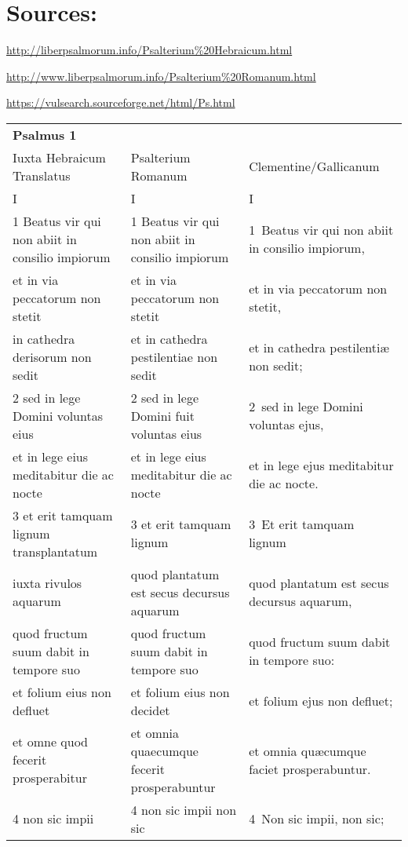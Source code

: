 \documentclass{article}
\begin{document}
					
					
\section*{Sources:}					

\url{http://liberpsalmorum.info/Psalterium%20Hebraicum.html}					

\url{http://www.liberpsalmorum.info/Psalterium%20Romanum.html}					

\url{https://vulsearch.sourceforge.net/html/Ps.html}					
					
\begin{longtable}{@{}p{}p{}p{}@{}}					
\textbf{Psalmus 1}					\\
Iuxta Hebraicum Translatus	&	Psalterium Romanum	&	Clementine/Gallicanum	\\
I	&	I	&	I	\\
1 Beatus vir qui non abiit in consilio impiorum	&	1 Beatus vir qui non abiit in consilio impiorum	&	1 Beatus vir qui non abiit in consilio impiorum,	\\
et in via peccatorum non stetit	&	et in via peccatorum non stetit	&	et in via peccatorum non stetit,	\\
in cathedra derisorum non sedit	&	et in cathedra pestilentiae non sedit	&	et in cathedra pestilentiæ non sedit;	\\
2 sed in lege Domini voluntas eius	&	2 sed in lege Domini fuit voluntas eius	&	2 sed in lege Domini voluntas ejus,	\\
et in lege eius meditabitur die ac nocte	&	et in lege eius meditabitur die ac nocte	&	et in lege ejus meditabitur die ac nocte.	\\
3 et erit tamquam lignum transplantatum 	&	3 et erit tamquam lignum	&	3 Et erit tamquam lignum 	\\
iuxta rivulos aquarum	&	quod plantatum est secus decursus aquarum	&	quod plantatum est secus decursus aquarum,	\\
quod fructum suum dabit in tempore suo	&	quod fructum suum dabit in tempore suo	&	quod fructum suum dabit in tempore suo:	\\
et folium eius non defluet	&	et folium eius non decidet	&	et folium ejus non defluet;	\\
et omne quod fecerit prosperabitur	&	et omnia quaecumque fecerit prosperabuntur	&	et omnia quæcumque faciet prosperabuntur.	\\
4 non sic impii	&	4 non sic impii non sic	&	4 Non sic impii, non sic;	\\

\end{longtable}
\end{document}
